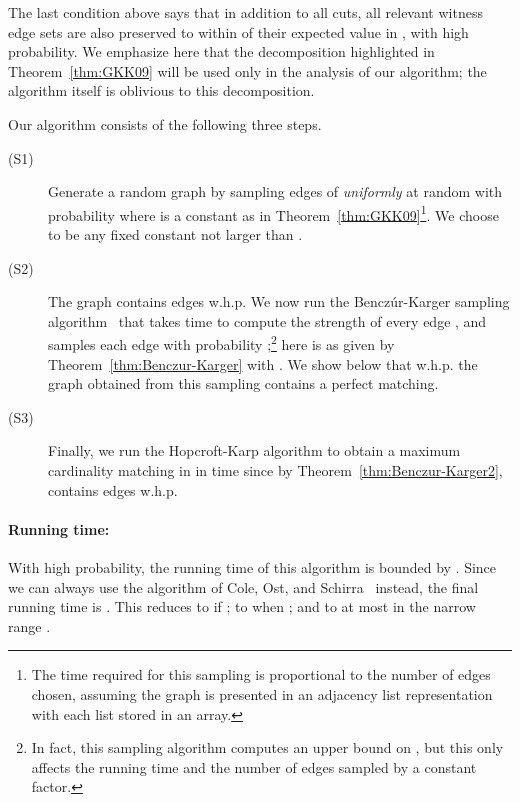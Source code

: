 \documentclass[11pt]{article}
\begin{document}
The last condition above says that in addition to all cuts, all relevant
witness edge sets are also preserved to within  of their
expected value in , with high probability. We emphasize here that the
decomposition highlighted in Theorem~\ref{thm:GKK09} will be used only in the
analysis of our algorithm; the algorithm itself is oblivious to this
decomposition.

Our algorithm consists of the following three steps.

\begin{description}

\item[(S1)] Generate a random graph  by sampling edges of 
  {\em uniformly} at random with probability 
  where  is a constant as in Theorem~\ref{thm:GKK09}\footnote{The time
    required for this sampling is proportional to the number of edges chosen,
    assuming the graph is presented in an adjacency list representation with
    each list stored in an array.}.  We choose  to be any fixed
  constant not larger than .

\item[(S2)] The graph  contains  edges w.h.p. We
  now run the Bencz\'{u}r-Karger sampling algorithm~\cite{benczurkarger96} that
  takes  time to compute the strength  of every edge ,
  and samples each edge  with probability ;\footnote{In fact, this
    sampling algorithm computes an upper bound on , but this only affects
    the running time and the number of edges sampled by a constant factor.}
  here  is as given by Theorem~\ref{thm:Benczur-Karger} with . We show below that w.h.p. the graph  obtained
  from this sampling contains a perfect matching.

\item[(S3)] Finally, we run the Hopcroft-Karp algorithm to obtain a maximum
  cardinality matching in  in  time since by
  Theorem~\ref{thm:Benczur-Karger2},  contains  edges w.h.p.
\end{description}

\paragraph{Running time:} With high probability, the running time of this
algorithm is bounded by . Since we can
always use the algorithm of Cole, Ost, and Schirra~\cite{cos:regular2001}
instead, the final running time is . This reduces to  if ; to
 when ; and to at most  in the narrow range .
\end{document}
